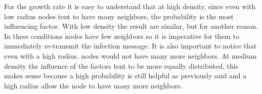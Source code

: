 For the growth rate it is easy to understand that at high density, since even with low radius nodes tent to have many neighbors, the probability is the most influencing factor. With low density the result are similar, but for another reason. In these conditions nodes have few neighbors so it is imperative for them to immediately re-transmit the infection message. It is also important to notice that even with a high radius, nodes would not have many more neighbors. At medium density the influence of the factors tent to be more equally distributed, this makes sense because a high probability is still helpful as previously said and a high radius allow the node to have many more neighbors.

